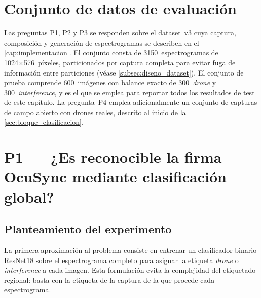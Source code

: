 \section{Conjunto de datos de evaluación}
\label{sec:dataset_evaluacion}

Las preguntas P1, P2 y P3 se responden sobre el dataset~v3 cuya captura, composición y generación de espectrogramas se describen en el \cref{cap:implementacion}. El conjunto consta de \num{3150}~espectrogramas de \num{1024}×\num{576}~píxeles, particionados por captura completa para evitar fuga de información entre particiones (véase \cref{subsec:diseno_dataset}). El conjunto de prueba comprende \num{600}~imágenes con balance exacto de \num{300}~\emph{drone} y \num{300}~\emph{interference}, y es el que se emplea para reportar todos los resultados de test de este capítulo. La pregunta~P4 emplea adicionalmente un conjunto de capturas de campo abierto con drones reales, descrito al inicio de la \cref{sec:bloque_clasificacion}.



\section{P1 --- ¿Es reconocible la firma OcuSync mediante clasificación global?}
\label{sec:bloque_resnet_detector}

\subsection{Planteamiento del experimento}
\label{sec:p1_planteamiento}

La primera aproximación al problema consiste en entrenar un clasificador binario ResNet18 sobre el espectrograma completo para asignar la etiqueta \emph{drone} o \emph{interference} a cada imagen. Esta formulación evita la complejidad del etiquetado regional: basta con la etiqueta de la captura de la que procede cada espectrograma.

